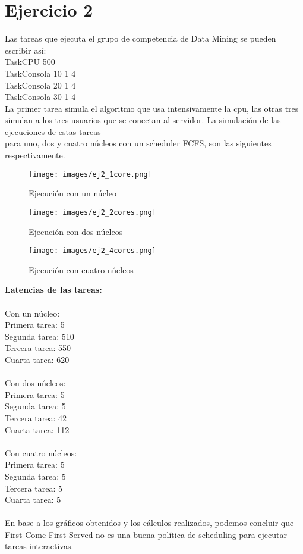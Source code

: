 \section{Ejercicio 2}
Las tareas que ejecuta el grupo de competencia de Data Mining se pueden escribir así:\\
TaskCPU 500\\
TaskConsola 10 1 4\\
TaskConsola 20 1 4\\
TaskConsola 30 1 4\\

La primer tarea simula el algoritmo que usa intensivamente la cpu, las otras tres simulan a los tres usuarios que se conectan al servidor.
La simulación de las ejecuciones de estas tareas\\
para uno, dos y cuatro núcleos con un scheduler FCFS, son las siguientes respectivamente.\\

\begin{figure}[h]
  \centering
    \texttt{[image: images/ej2\_1core.png]}
  \caption{Ejecución con un núcleo}
  \label{fig:imagen2_1}
\end{figure}
\begin{figure}[h]
  \centering
    \texttt{[image: images/ej2\_2cores.png]}
  \caption{Ejecución con dos núcleos}
  \label{fig:imagen2_2}
\end{figure}
\begin{figure}[h]
  \centering
    \texttt{[image: images/ej2\_4cores.png]}
  \caption{Ejecución con cuatro núcleos}
  \label{fig:imagen2_4}
\end{figure}
{\bf Latencias de las tareas:}\\\\
Con un núcleo:\\
Primera tarea: 5\\
Segunda tarea: 510\\
Tercera tarea: 550\\
Cuarta tarea: 620\\\\
Con dos núcleos:\\
Primera tarea: 5\\
Segunda tarea: 5\\
Tercera tarea: 42\\
Cuarta tarea: 112\\\\
Con cuatro núcleos:\\
Primera tarea: 5\\
Segunda tarea: 5\\
Tercera tarea: 5\\
Cuarta tarea: 5\\\\
En base a los gráficos obtenidos y los cálculos realizados, podemos concluir que First Come First Served no es una buena política de scheduling para ejecutar tareas interactivas.  

